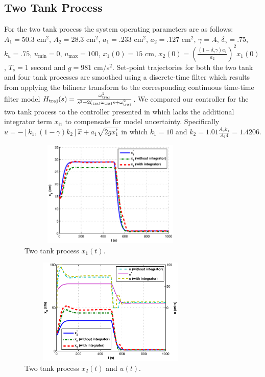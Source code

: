 \subsection{Two Tank Process}
For the two tank process the system operating parameters are as
follows: $A_1=50.3$ cm$^2$, $A_2=28.3$ cm$^2$, $a_1=.233$ cm$^2$, $a_2=.127$
cm$^2$, $\gamma=.4$, $\delta_{\gamma}=.75$, $k_u=.75$, $u_{\min}=0$,
$u_{\max}=100$, $x_1(0)=15$ cm, $x_2(0)=\left (
  \frac{(1-\delta_{\gamma}\gamma)a_1}{a_2} \right )^2x_1(0)$, $T_s=1$
second and $g=981$ cm/s$^2$.  Set-point trajectories for both the two
tank and four tank processes are smoothed using a discrete-time filter
which results from applying the bilinear transform to the
corresponding continuous time-time filter model $H_{\operatorname{traj}}(s)=\frac{\omega_{\operatorname{traj}}^2}{s^2 +
  2\zeta_{\operatorname{traj}}\omega_{\operatorname{traj}} s + \omega_{\operatorname{traj}}^2}$.  We compared
our controller for the two tank process to the controller presented in  
\cite{johnsen07:_inter_and_dampin_assig_passiv} which lacks
the additional integrator term $x_{\mathsf{I}1}$ to compensate for
model uncertainty.  Specifically $u=-[k_1,(1-\gamma)k_2]\hat{x} +
a_1\sqrt{2gx_1^*}$ in which $k_1 = 10$ and  $k_2 = 1.01 \frac{A_2
  k_1}{A_1 4} = 1.4206$.
\begin{figure}
  \centering
  \includegraphics*[width=3.5in,height=2in, viewport=20 10 400 300]{figures/two_tank_x1}
  \caption{Two tank process $x_1(t)$.}
  \label{F:two_tank_x1}
\end{figure}
\begin{figure}
  \centering
  \includegraphics*[width=3.5in,height=2in, viewport=15 10 415 300]{figures/two_tank_x2_u}
  \caption{Two tank process $x_2(t)$ and $u(t)$.}
  \label{F:two_tank_x2}
\end{figure}

